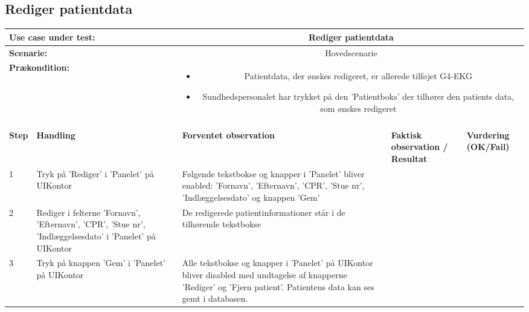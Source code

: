 \subsection{Rediger patientdata}
\begin{tabular}{|p{1cm}|p{3cm}|p{4cm}|p{4cm}|p{2cm}|}
\hline
\multicolumn{2}{|p{4cm}|}{\textbf{Use case under test:}} & \multicolumn{3}{c|}{Rediger patientdata} \\\hline

\multicolumn{2}{|p{3cm}|}{\textbf{Scenarie:}} & \multicolumn{3}{c|}{Hovedscenarie} \\\hline

\multicolumn{2}{|p{3cm}|}{\textbf{Prækondition:}}  & \multicolumn{3}{c|}{\parbox{0.8\textwidth}{
\begin{itemize}[label=$\circ$]
\item Patientdata, der ønskes redigeret, er allerede tilføjet G4-EKG 
\item Sundhedspersonalet har trykket på den 'Patientboks' der tilhører den patients data, som ønskes redigeret
\end{itemize} }}\\\hline

\multicolumn{5}{|c|}{} \\\hline

\textbf{Step} & \textbf{Handling} & \textbf{Forventet observation} & \textbf{Faktisk observation / Resultat} & \textbf{Vurdering (OK/Fail)}\\\hline

1 & Tryk på 'Rediger' i 'Panelet' på UIKontor & Følgende tekstbokse og knapper i 'Panelet' bliver enabled: 'Fornavn', 'Efternavn', 'CPR', 'Stue nr', 'Indlæggelsesdato' og knappen 'Gem' & & \\\hline

2 & Rediger i felterne 'Fornavn', 'Efternavn', 'CPR', 'Stue nr', 'Indlæggelsesdato' i 'Panelet' på UIKontor & De redigerede patientinformationer står i de tilhørende tekstbokse & & \\\hline

3 & Tryk på knappen 'Gem' i 'Panelet' på UIKontor & Alle tekstbokse og knapper i 'Panelet' på UIKontor bliver disabled med undtagelse af knapperne 'Rediger' og 'Fjern patient'. Patientens data kan ses gemt i databasen. & & \\\hline

\end{tabular}
\\

